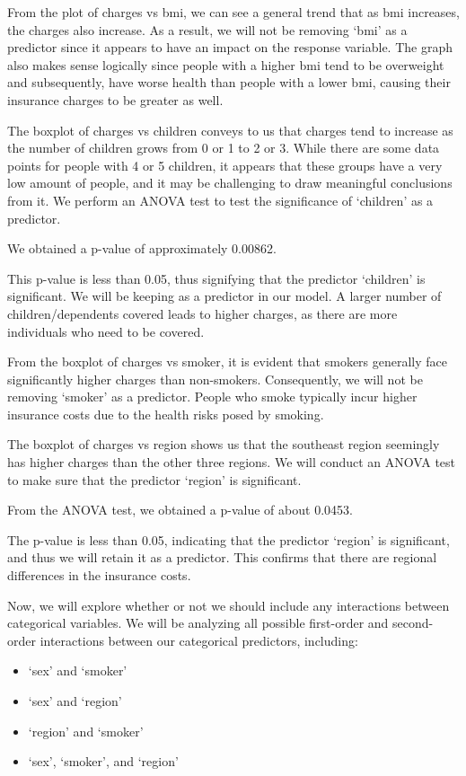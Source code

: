 \documentclass[
  12pt,
]{article}
\providecommand{\tightlist}{%
  \setlength{\itemsep}{0pt}\setlength{\parskip}{0pt}}
\begin{document}
From the plot of charges vs bmi, we can see a general trend that as bmi
increases, the charges also increase. As a result, we will not be
removing `bmi' as a predictor since it appears to have an impact on the
response variable. The graph also makes sense logically since people
with a higher bmi tend to be overweight and subsequently, have worse
health than people with a lower bmi, causing their insurance charges to
be greater as well.

The boxplot of charges vs children conveys to us that charges tend to
increase as the number of children grows from 0 or 1 to 2 or 3. While
there are some data points for people with 4 or 5 children, it appears
that these groups have a very low amount of people, and it may be
challenging to draw meaningful conclusions from it. We perform an ANOVA
test to test the significance of `children' as a predictor.

We obtained a p-value of approximately 0.00862.

This p-value is less than 0.05, thus signifying that the predictor
`children' is significant. We will be keeping as a predictor in our
model. A larger number of children/dependents covered leads to higher
charges, as there are more individuals who need to be covered.

From the boxplot of charges vs smoker, it is evident that smokers
generally face significantly higher charges than non-smokers.
Consequently, we will not be removing `smoker' as a predictor. People
who smoke typically incur higher insurance costs due to the health risks
posed by smoking.

The boxplot of charges vs region shows us that the southeast region
seemingly has higher charges than the other three regions. We will
conduct an ANOVA test to make sure that the predictor `region' is
significant.

From the ANOVA test, we obtained a p-value of about 0.0453.

The p-value is less than 0.05, indicating that the predictor `region' is
significant, and thus we will retain it as a predictor. This confirms
that there are regional differences in the insurance costs.

\newpage

Now, we will explore whether or not we should include any interactions
between categorical variables. We will be analyzing all possible
first-order and second-order interactions between our categorical
predictors, including:

\begin{itemize}
\tightlist
\item
  `sex' and `smoker'
\item
  `sex' and `region'
\item
  `region' and `smoker'
\item
  `sex', `smoker', and `region'
\end{itemize}
\end{document}
